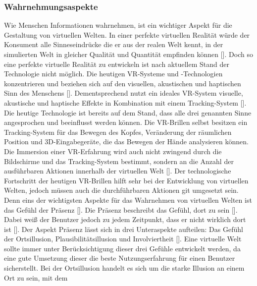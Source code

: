 \documentclass[a4paper,12pt,oneside]{article}
\begin{document}
      \subsubsection{Wahrnehmungsaspekte} \label{Wahrnehmungsaspekte}
        Wie Menschen Informationen wahrnehmen, ist ein wichtiger Aspekt für die Gestaltung
        von virtuellen Welten. In einer perfekte virtuellen Realität würde der Konsument
        alle Sinneseindrücke die er aus der realen Welt kennt, in der simulierten Welt
        in gleicher Qualität und Quantität empfinden können [\cite[17]{Dorner2019}].
        Doch so eine perfekte virtuelle Realität zu entwickeln ist nach aktuellem Stand
        der Technologie nicht möglich. Die heutigen VR-Systeme und -Technologien
        konzentrieren und beziehen sich auf den visuellen, akustischen und haptischen Sinn
        des Menschens [\cite[34]{Dorner2019}]. Dementsprechend nutzt ein ideales
        VR-System visuelle, akustische und haptische Effekte in Kombination mit einem
        Tracking-System [\cite{Slater2009}]. Die heutige Technologie ist bereits auf
        dem Stand, dass alle drei genannten Sinne angesprochen und beeinflusst
        werden können. Die VR-Brillen selbst besitzen ein Tracking-System für das
        Bewegen des Kopfes, Veränderung der räumlichen Position und 3D-Eingabegeräte,
        die das Bewegen der Hände analysieren können. Die Immersion einer VR-Erfahrung
        wird auch nicht zwingend durch die Bildschirme und das Tracking-System bestimmt,
        sondern an die Anzahl der ausführbaren Aktionen innerhalb der virtuellen 
        Welt [\cite{Slater2009}]. Der technologische Fortschritt der heutigen VR-Brillen
        hilft sehr bei der Entwicklung von virtuellen Welten, jedoch müssen auch die
        durchführbaren Aktionen git umgesetzt sein. Denn eins der wichtigsten Aspekte
        für das Wahrnehmen von virtuellen Welten ist das Gefühl der 
        Präsenz [\cite{Slater2009}]. Die Präsenz beschreibt das Gefühl, dort zu sein
        [\cite{Slater2009}]. Dabei weiß der Benutzer jedoch zu jedem Zeitpunkt, dass er
        nicht wirklich dort ist [\cite{Slater2009}]. Der Aspekt Präsenz lässt sich in
        drei Unteraspekte aufteilen: Das Gefühl der Ortsillusion, Plausibilitätsillusion
        und Involviertheit [\cite[18-19]{Dorner2019}]. Eine virtuelle Welt sollte immer unter
        Berücksichtigung dieser drei Gefühle entwickelt werden, da eine gute Umsetzung
        dieser die beste Nutzungserfahrung für einen Benutzer sicherstellt. Bei der 
        Ortsillusion handelt es sich um die starke Illusion an einem Ort zu sein, mit dem
\end{document}
